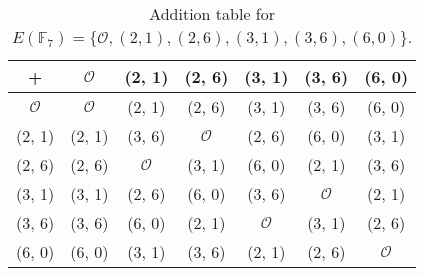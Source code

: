 \documentclass[
  coursecode={MTHE 418},
  assignmentname={Homework \homeworknumber},
  studentnumber=20053722,
  name={Bryan Hoang},
  draft,
]{
  ltxanswer%
}
\begin{document}
\begin{questions}
\begin{parts}
      \part{}
      \begin{solution}
        \begin{table}
          \caption{Addition table for \(E(\mathbb{F}_{7}) = \{\mathcal{O}, (2, 1), (2, 6), (3, 1), (3, 6), (6, 0)\}\).}
          \renewcommand\arraystretch{1.3}
          \setlength\doublerulesep{0pt}
          \begin{tabular}{|c||*{6}{c|}}
            \hline
            +               & \(\mathcal{O}\) & (2, 1)          & (2, 6)          & (3, 1)          & (3, 6)          & (6, 0)          \\
            \hline
            \(\mathcal{O}\) & \(\mathcal{O}\) & (2, 1)          & (2, 6)          & (3, 1)          & (3, 6)          & (6, 0)          \\
            \hline
            (2, 1)          & (2, 1)          & (3, 6)          & \(\mathcal{O}\) & (2, 6)          & (6, 0)          & (3, 1)          \\
            \hline
            (2, 6)          & (2, 6)          & \(\mathcal{O}\) & (3, 1)          & (6, 0)          & (2, 1)          & (3, 6)          \\
            \hline
            (3, 1)          & (3, 1)          & (2, 6)          & (6, 0)          & (3, 6)          & \(\mathcal{O}\) & (2, 1)          \\
            \hline
            (3, 6)          & (3, 6)          & (6, 0)          & (2, 1)          & \(\mathcal{O}\) & (3, 1)          & (2, 6)          \\
            \hline
            (6, 0)          & (6, 0)          & (3, 1)          & (3, 6)          & (2, 1)          & (2, 6)          & \(\mathcal{O}\) \\
            \hline
          \end{tabular}
        \end{table}
      \end{solution}
    \end{parts}
  \end{questions}
\end{document}
